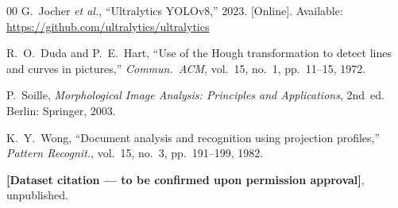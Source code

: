 \documentclass[conference]{IEEEtran}
\begin{document}
\begin{thebibliography}{00}
G.\ Jocher \textit{et al.},
``Ultralytics YOLOv8,'' 2023.
[Online]. Available: \url{https://github.com/ultralytics/ultralytics}

R.\ O.\ Duda and P.\ E.\ Hart,
``Use of the Hough transformation to detect lines and curves
in pictures,''
\textit{Commun.\ ACM}, vol.~15, no.~1, pp.~11--15, 1972.

P.\ Soille,
\textit{Morphological Image Analysis: Principles and
Applications}, 2nd~ed.
Berlin: Springer, 2003.

K.\ Y.\ Wong,
``Document analysis and recognition using projection
profiles,''
\textit{Pattern Recognit.}, vol.~15, no.~3, pp.~191--199, 1982.

\textbf{[Dataset citation --- to be confirmed upon permission
approval]}, unpublished.

\end{thebibliography}
\end{document}
